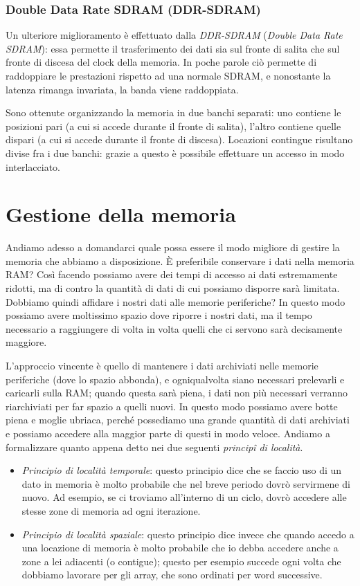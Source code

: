 \documentclass[class=book, crop=false, oneside]{standalone}
\begin{document}
\subsubsection{Double Data Rate SDRAM (DDR-SDRAM)}
Un ulteriore miglioramento è effettuato dalla \emph{DDR-SDRAM} (\emph{Double Data Rate SDRAM}): essa permette il trasferimento dei dati sia sul fronte di salita che sul fronte di discesa del clock della memoria. In poche parole ciò permette di raddoppiare le prestazioni rispetto ad una normale SDRAM, e nonostante la latenza rimanga invariata, la banda viene raddoppiata.

Sono ottenute organizzando la memoria in due banchi separati: uno contiene le posizioni pari (a cui si accede durante il fronte di salita), l'altro contiene quelle dispari (a cui si accede durante il fronte di discesa). Locazioni contingue risultano divise fra i due banchi: grazie a questo è possibile effettuare un accesso in modo interlacciato.

\section{Gestione della memoria}
Andiamo adesso a domandarci quale possa essere il modo migliore di gestire la memoria che abbiamo a disposizione. È preferibile conservare i dati nella memoria RAM? Così facendo possiamo avere dei tempi di accesso ai dati estremamente ridotti, ma di contro la quantità di dati di cui possiamo disporre sarà limitata. Dobbiamo quindi affidare i nostri dati alle memorie periferiche? In questo modo possiamo avere moltissimo spazio dove riporre i nostri dati, ma il tempo necessario a raggiungere di volta in volta quelli che ci servono sarà decisamente maggiore.

L'approccio vincente è quello di mantenere i dati archiviati nelle memorie periferiche (dove lo spazio abbonda), e ogniqualvolta siano necessari prelevarli e caricarli sulla RAM; quando questa sarà piena, i dati non più necessari verranno riarchiviati per far spazio a quelli nuovi. In questo modo possiamo avere botte piena e moglie ubriaca, perché possediamo una grande quantità di dati archiviati e possiamo accedere alla maggior parte di questi in modo veloce. Andiamo a formalizzare quanto appena detto nei due seguenti \emph{principî di località}.
\begin{itemize}
	\item \emph{Principio di località temporale}: questo principio dice che se faccio uso di un dato in memoria è molto probabile che nel breve periodo dovrò servirmene di nuovo. Ad esempio, se ci troviamo all'interno di un ciclo, dovrò accedere alle stesse zone di memoria ad ogni iterazione.
	\item \emph{Principio di località spaziale}: questo principio dice invece che quando accedo a una locazione di memoria è molto probabile che io debba accedere anche a zone a lei adiacenti (o contigue); questo per esempio succede ogni volta che dobbiamo lavorare per gli array, che sono ordinati per word successive.
\end{itemize}
\end{document}
